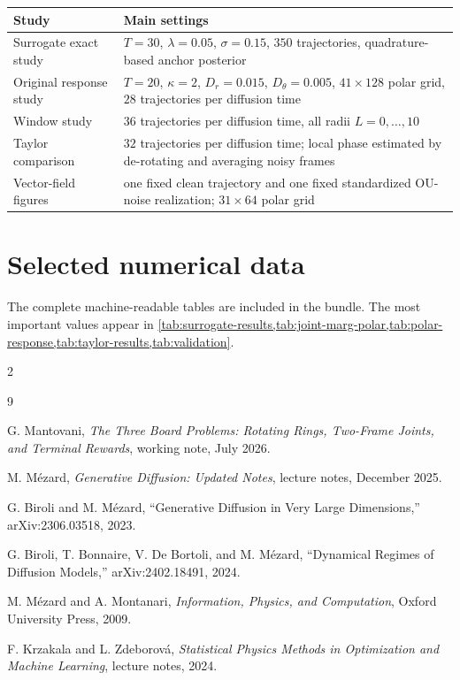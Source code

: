 \documentclass[11pt,a4paper]{article}
\begin{document}
\begin{table}[H]
\centering
\small
\begin{tabularx}{\textwidth}{@{}lX@{}}
\toprule
Study & Main settings \\
\midrule
Surrogate exact study & $T=30$, $\lambda=0.05$, $\sigma=0.15$, $350$ trajectories, quadrature-based anchor posterior \\
Original response study & $T=20$, $\kappa=2$, $D_r=0.015$, $D_\theta=0.005$, $41\times128$ polar grid, $28$ trajectories per diffusion time \\
Window study & $36$ trajectories per diffusion time, all radii $L=0,\ldots,10$ \\
Taylor comparison & $32$ trajectories per diffusion time; local phase estimated by de-rotating and averaging noisy frames \\
Vector-field figures & one fixed clean trajectory and one fixed standardized OU-noise realization; $31\times64$ polar grid \\
\bottomrule
\end{tabularx}
\end{table}

\section{Selected numerical data}

The complete machine-readable tables are included in the bundle. The most important values appear in \cref{tab:surrogate-results,tab:joint-marg-polar,tab:polar-response,tab:taylor-results,tab:validation}.

\begin{multicols}{2}
\raggedcolumns
\scriptsize
\begin{thebibliography}{9}
\setlength{\itemsep}{0.15em}
\setlength{\parskip}{0pt}

G. Mantovani,
\emph{The Three Board Problems: Rotating Rings, Two-Frame Joints, and Terminal Rewards},
working note, July 2026.

M. M\'ezard,
\emph{Generative Diffusion: Updated Notes},
lecture notes, December 2025.

\columnbreak
{}
G. Biroli and M. M\'ezard,
``Generative Diffusion in Very Large Dimensions,''
arXiv:2306.03518, 2023.

G. Biroli, T. Bonnaire, V. De Bortoli, and M. M\'ezard,
``Dynamical Regimes of Diffusion Models,''
arXiv:2402.18491, 2024.

M. M\'ezard and A. Montanari,
\emph{Information, Physics, and Computation},
Oxford University Press, 2009.

F. Krzakala and L. Zdeborov\'a,
\emph{Statistical Physics Methods in Optimization and Machine Learning},
lecture notes, 2024.

\end{thebibliography}
\end{multicols}
\end{document}
